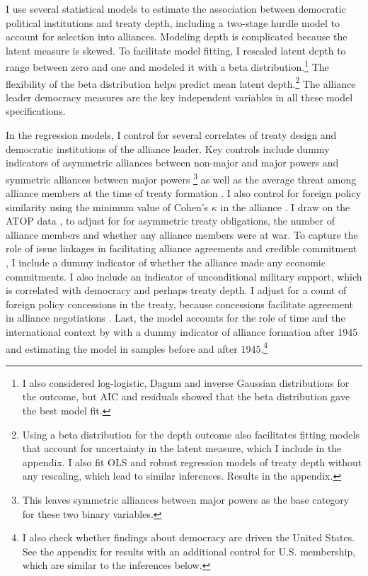 \documentclass[12pt]{article}
\begin{document}
I use several statistical models to estimate the association between democratic political institutions and treaty depth, including a two-stage hurdle model to account for selection into alliances. 
Modeling depth is complicated because the latent measure is skewed.
To facilitate model fitting, I rescaled latent depth to range between zero and one and modeled it with a beta distribution.\footnote{I also considered log-logistic, Dagum and inverse Gaussian distributions for the outcome, but AIC and residuals showed that the beta distribution gave the best model fit.}
The flexibility of the beta distribution helps predict mean latent depth.\footnote{Using a beta distribution for the depth outcome also facilitates fitting models that account for uncertainty in the latent measure, which I include in the appendix. I also fit OLS and robust regression models of treaty depth without any rescaling, which lead to similar inferences. Results in the appendix.} 
The alliance leader democracy measures are the key independent variables in all these model specifications. 


In the regression models, I control for several correlates of treaty design and democratic institutions of the alliance leader. 
Key controls include dummy indicators of asymmetric alliances between non-major and major powers and symmetric alliances between major powers \citep{Mattes2012}\footnote{This leaves symmetric alliances between major powers as the base category for these two binary variables.} as well as the average threat among alliance members at the time of treaty formation \citep{LeedsSavun2007}. 
I also control for foreign policy similarity using the minimum value of Cohen's $\kappa$ in the alliance \citep{Hage2011}.
I draw on the ATOP data \citep{Leedsetal2002}, to adjust for for asymmetric treaty obligations, the number of alliance members and whether any alliance members were at war. 
To capture the role of issue linkages in facilitating alliance agreements and credible commitment \citep{Poast2012, Poast2013}, I include a dummy indicator of whether the alliance made any economic commitments. 
I also include an indicator of unconditional military support, which is correlated with democracy \citep{Chibaetal2015} and perhaps treaty depth. 
I adjust for a count of foreign policy concessions in the treaty, because concessions facilitate agreement in alliance negotiations \citep{Johnson2015}. 
Last, the model accounts for the role of time and the international context by with a dummy indicator of alliance formation after 1945 and estimating the model in samples before and after 1945.\footnote{I also check whether findings about democracy are driven the United States. See the appendix for results with an additional control for U.S. membership, which are similar to the inferences below.}
\end{document}
